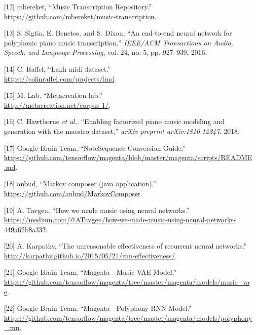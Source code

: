 \documentclass[12pt,]{article}
\begin{document}
\leavevmode\hypertarget{ref-mbereket}{}%
{[}12{]} \relax mbereket, ``Music Transcription Repository.'' \\
\url{https://github.com/mbereket/music-transcription}.

\leavevmode\hypertarget{ref-sigtia2016end}{}%
{[}13{]} S. Sigtia, E. Benetos, and S. Dixon, ``An end-to-end neural
network for polyphonic piano music transcription,'' \emph{IEEE/ACM
Transactions on Audio, Speech, and Language Processing}, vol. 24, no. 5,
pp. 927--939, 2016.

\leavevmode\hypertarget{ref-lakh}{}%
{[}14{]} C. Raffel, ``Lakh midi dataset.'' \\
\url{https://colinraffel.com/projects/lmd}.

\leavevmode\hypertarget{ref-metacreation}{}%
{[}15{]} M. Lab, ``Metacreation lab.'' \\
\url{http://metacreation.net/corpus-1/}.

\leavevmode\hypertarget{ref-maestro2018}{}%
{[}16{]} C. Hawthorne \emph{et al.}, ``Enabling factorized piano music
modeling and generation with the maestro dataset,'' \emph{arXiv preprint
arXiv:1810.12247}. 2018.

\leavevmode\hypertarget{ref-notesequences}{}%
{[}17{]} \relax Google Brain Team, ``NoteSequence Conversion Guide.'' \\
\url{https://github.com/tensorflow/magenta/blob/master/magenta/scripts/README.md}.

\leavevmode\hypertarget{ref-markovcomposer}{}%
{[}18{]} \relax anbud, ``Markov composer (java application).'' \\
\url{https://github.com/anbud/MarkovComposer}.

\leavevmode\hypertarget{ref-alextavgen}{}%
{[}19{]} A. Tavgen, ``How we made music using neural networks.'' \\
\url{https://medium.com/@ATavgen/how-we-made-music-using-neural-networks-449a62b8a332}.

\leavevmode\hypertarget{ref-karpathy}{}%
{[}20{]} A. Karpathy, ``The unreasonable effectiveness of recurrent
neural networks.'' \\
\url{http://karpathy.github.io/2015/05/21/rnn-effectiveness/}.

\leavevmode\hypertarget{ref-magentavae}{}%
{[}21{]} \relax Google Brain Team, ``Magenta - Music VAE Model.'' \\
\url{https://github.com/tensorflow/magenta/tree/master/magenta/models/music_vae}.

\leavevmode\hypertarget{ref-magentapolyphony}{}%
{[}22{]} \relax Google Brain Team, ``Magenta - Polyphony RNN Model.'' \\
\url{https://github.com/tensorflow/magenta/tree/master/magenta/models/polyphony_rnn}.
\end{document}
